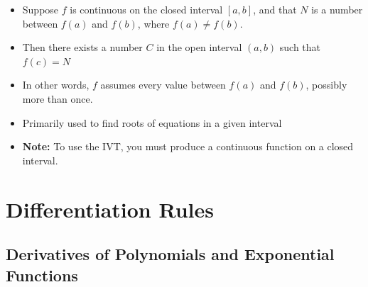 \documentclass[11pt]{article}
\theoremstyle{plain}
\theoremstyle{definition}
\begin{document}
\begin{itemize}
	\item Suppose $f$ is continuous on the closed interval $[a,b]$, and that $N$ is a number between $f(a)$ and $f(b)$, where $f(a)\neq f(b)$. 
	\item Then there exists a number $C$ in the open interval $(a,b)$ such that $f(c)=N$
	\item In other words, $f$ assumes every value between $f(a)$ and $f(b)$, possibly more than once.
	\item Primarily used to find roots of equations in a given interval
	\item \textbf{Note:} To use the IVT, you must produce a continuous function on a closed interval.
\end{itemize}


\section{Differentiation Rules}

\subsection{Derivatives of Polynomials and Exponential Functions}
\end{document}

